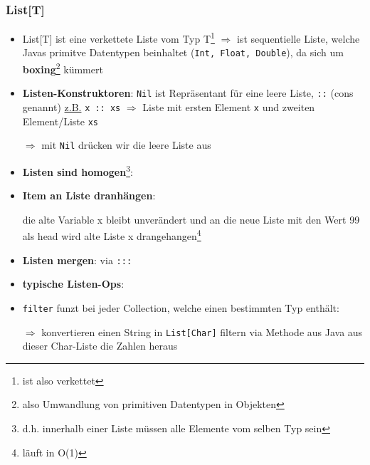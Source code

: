 \subsubsection{List[T]}
\begin{itemize}
  \item List[T] ist eine verkettete Liste vom 
  Typ T\footnote{ist also verkettet} $\Rightarrow$ ist sequentielle
  Liste, welche Javas primitve Datentypen beinhaltet 
  (\texttt{Int, Float, Double}), da sich um 
  \textbf{boxing}\footnote{also Umwandlung von primitiven
  Datentypen in Objekten} kümmert
  \item \textbf{Listen-Konstruktoren}: \texttt{Nil} ist
  Repräsentant für eine leere Liste, \texttt{::} (cons genannt)
  \uline{z.B.} 
  \texttt{x :: xs} $\Rightarrow$ Liste mit ersten Element \texttt{x}
  und zweiten Element/Liste \texttt{xs}
  
  
  
  $\Rightarrow$ mit \texttt{Nil} drücken wir die leere Liste aus
  \item \textbf{Listen sind homogen}\footnote{d.h. innerhalb einer
  Liste müssen alle Elemente vom selben Typ sein}:
  
  
  
  \item \textbf{Item an Liste dranhängen}:
  
  
  
  die alte Variable x bleibt unverändert und an die neue Liste mit
  den Wert 99 als head wird alte Liste x 
  drangehangen\footnote{läuft in O(1)}
  \item \textbf{Listen mergen}: via \texttt{:::}
  
  
  
  \item \textbf{typische Listen-Ops}:
  
  
  
  \item \texttt{filter} funzt bei jeder Collection, welche einen
  bestimmten Typ enthält:
  
  
  
  $\Rightarrow$ konvertieren einen String in \texttt{List[Char]} \und 
  filtern via Methode aus Java aus dieser Char-Liste die Zahlen heraus
\end{itemize}


